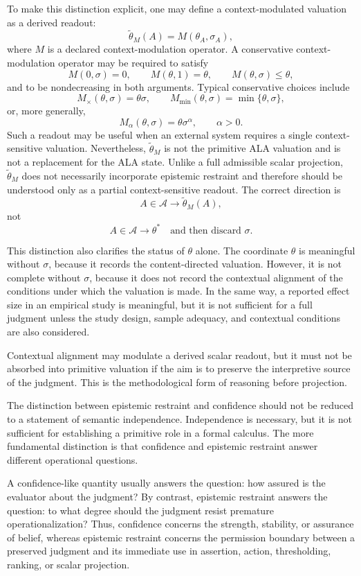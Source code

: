 \documentclass[reqno,final]{amsart}
\theoremstyle{definition}
\theoremstyle{plain}
\theoremstyle{remark}
\providecommand{\cA}{\mathcal{A}}
\begin{document}
To make this distinction explicit, one may define a context-modulated valuation as a derived readout:
\[
\widetilde{\theta}_M(A)=M(\theta_A,\sigma_A),
\]
where \(M\) is a declared context-modulation operator. A conservative context-modulation operator may be required to satisfy
\[
M(0,\sigma)=0,\qquad M(\theta,1)=\theta,\qquad M(\theta,\sigma)\leq \theta,
\]
and to be nondecreasing in both arguments. Typical conservative choices include
\[
M_{\times}(\theta,\sigma)=\theta\sigma,\qquad
M_{\min}(\theta,\sigma)=\min\{\theta,\sigma\},
\]
or, more generally,
\[
M_{\alpha}(\theta,\sigma)=\theta\sigma^\alpha,\qquad \alpha>0.
\]
Such a readout may be useful when an external system requires a single context-sensitive valuation. Nevertheless, \(\widetilde{\theta}_M\) is not the primitive ALA valuation and is not a replacement for the ALA state. Unlike a full admissible scalar projection, \(\widetilde{\theta}_M\) does not necessarily incorporate epistemic restraint and therefore should be understood only as a partial context-sensitive readout. The correct direction is
\[
A\in\cA\longrightarrow \widetilde{\theta}_M(A),
\]
not
\[
A\in\cA\longrightarrow \theta^\ast
\quad\text{and then discard }\sigma.
\]

This distinction also clarifies the status of \(\theta\) alone. The coordinate \(\theta\) is meaningful without \(\sigma\), because it records the content-directed valuation. However, it is not complete without \(\sigma\), because it does not record the contextual alignment of the conditions under which the valuation is made. In the same way, a reported effect size in an empirical study is meaningful, but it is not sufficient for a full judgment unless the study design, sample adequacy, and contextual conditions are also considered.

Contextual alignment may modulate a derived scalar readout, but it must not be absorbed into primitive valuation if the aim is to preserve the interpretive source of the judgment. This is the methodological form of reasoning before projection.

The distinction between epistemic restraint and confidence should not be reduced to a statement of semantic independence. Independence is necessary, but it is not sufficient for establishing a primitive role in a formal calculus. The more fundamental distinction is that confidence and epistemic restraint answer different operational questions.

A confidence-like quantity usually answers the question: how assured is the evaluator about the judgment? By contrast, epistemic restraint answers the question: to what degree should the judgment resist premature operationalization? Thus, confidence concerns the strength, stability, or assurance of belief, whereas epistemic restraint concerns the permission boundary between a preserved judgment and its immediate use in assertion, action, thresholding, ranking, or scalar projection.
\end{document}

